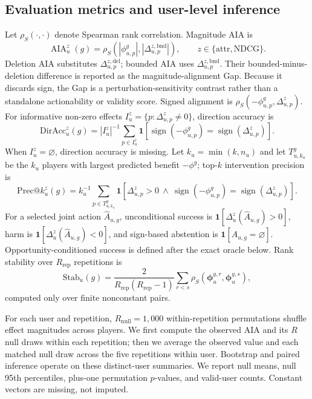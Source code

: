 \documentclass[pdflatex,sn-mathphys-num]{sn-jnl}
\newcommand{\AIA}{\operatorname{AIA}}
\begin{document}
\subsection{Evaluation metrics and user-level inference}
Let $\rho_S(\cdot,\cdot)$ denote Spearman rank correlation. Magnitude AIA is
\begin{equation}
\AIA_u^z(g)=\rho_S(|\phi^g_{u,p}|,|\Delta_{u,p}^{z,\mathrm{bnd}}|),\qquad z\in\{\mathrm{attr},\mathrm{NDCG}\}.
\label{eq:aia}
\end{equation}
Deletion AIA substitutes $\Delta_{u,p}^{z,\mathrm{del}}$; bounded AIA uses $\Delta_{u,p}^{z,\mathrm{bnd}}$. Their bounded-minus-deletion difference is reported as the magnitude-alignment Gap. Because it discards sign, the Gap is a perturbation-sensitivity contrast rather than a standalone actionability or validity score. Signed alignment is $\rho_S(-\phi^g_{u,p},\Delta_{u,p}^z)$. For informative non-zero effects $I_u^z=\{p:\Delta_{u,p}^z\ne0\}$, direction accuracy is
\begin{equation}
\mathrm{DirAcc}_u^z(g)=|I_u^z|^{-1}\sum_{p\in I_u^z}\mathbf{1}\left[\operatorname{sign}(-\phi^g_{u,p})=\operatorname{sign}(\Delta_{u,p}^z)\right].
\end{equation}
When $I_u^z=\varnothing$, direction accuracy is missing. Let $k_u=\min(k,n_u)$ and let $T_{u,k_u}^g$ be the $k_u$ players with largest predicted benefit $-\phi^g$; top-$k$ intervention precision is
\begin{equation}
\mathrm{Prec}@k_u^z(g)=k_u^{-1}\sum_{p\in T_{u,k_u}^g}\mathbf{1}\left[\Delta_{u,p}^z>0\ \wedge\ \operatorname{sign}(-\phi^g_{u,p})=\operatorname{sign}(\Delta_{u,p}^z)\right].
\end{equation}
For a selected joint action $\widehat A_{u,g}$, unconditional success is $\mathbf{1}[\Delta_u^z(\widehat A_{u,g})>0]$, harm is $\mathbf{1}[\Delta_u^z(\widehat A_{u,g})<0]$, and sign-based abstention is $\mathbf{1}[\widehat A_{u,g}=\varnothing]$. Opportunity-conditioned success is defined after the exact oracle below. Rank stability over $R_{\mathrm{rep}}$ repetitions is
\begin{equation}
\mathrm{Stab}_u(g)=\frac{2}{R_{\mathrm{rep}}(R_{\mathrm{rep}}-1)}\sum_{r<s}\rho_S(\boldsymbol\phi_{u}^{g,r},\boldsymbol\phi_{u}^{g,s}),
\end{equation}
computed only over finite nonconstant pairs.

For each user and repetition, $R_{\mathrm{null}}=1{,}000$ within-repetition permutations shuffle effect magnitudes across players. We first compute the observed AIA and its $R$ null draws within each repetition; then we average the observed value and each matched null draw across the five repetitions within user. Bootstrap and paired inference operate on these distinct-user summaries. We report null means, null 95th percentiles, plus-one permutation $p$-values, and valid-user counts. Constant vectors are missing, not imputed.
\end{document}
